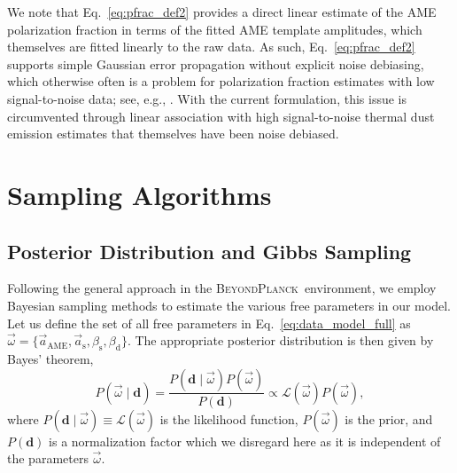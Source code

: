 \documentclass[twocolumn]{aa}
\renewcommand{\a}[0]{\vec{a}}
\newcommand{\BP}{\textsc{BeyondPlanck}}
\begin{document}
We note that Eq.~\eqref{eq:pfrac_def2} provides a direct linear
estimate of the AME polarization fraction in terms of the fitted AME
template amplitudes, which themselves are fitted linearly to the raw
data. As such, Eq.~\eqref{eq:pfrac_def2} supports simple Gaussian error
propagation without explicit noise debiasing, which otherwise often is
a problem for polarization fraction estimates with low signal-to-noise
data; see, e.g., \cite{pma2}. With the current
formulation, this issue is circumvented through linear association
with high signal-to-noise thermal dust emission estimates that themselves have
been noise debiased.

\section{Sampling Algorithms}\label{sec:algorithms}
\subsection{Posterior Distribution and Gibbs Sampling}\label{sub:gibbs}

Following the general approach in the \BP\ environment, we employ
Bayesian sampling methods to estimate the various free parameters in our
model. Let us define the set of all free parameters in
Eq.~\eqref{eq:data_model_full} as $\vec{\omega} = \{\a_{\mathrm{AME}},
\a_{\mathrm{s}}, \beta_{\mathrm{s}}, \beta_{\mathrm{d}}\}$. The
appropriate posterior distribution is then given by Bayes' theorem,
\begin{equation}
P(\vec{\omega}\mid\boldsymbol{d}) = \frac{P(\boldsymbol{d} \mid \vec{\omega}) P(\vec{\omega})}{P(\boldsymbol{d})} \propto \mathcal{L}(\vec{\omega}) P(\vec{\omega}),
\label{eq:bayes}
\end{equation}
where $ P(\boldsymbol{d}\mid\vec{\omega}) \equiv \mathcal{L}(\vec{\omega})$ is the likelihood function, $P(\vec{\omega})$ is the prior, and $P(\boldsymbol{d})$ is a normalization factor which we disregard here as it is independent of the parameters $\vec{\omega}$.
\end{document}
